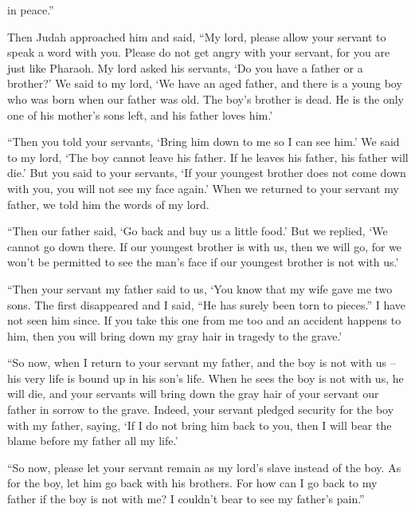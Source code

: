 {in peace.”
\par }{\PP {}Then Judah
approached
him and said,
“My lord,
please allow
your servant
to speak
a word
with you.
Please do not
get angry
with your servant,
for
you are just like
Pharaoh.
My lord
asked
his servants,
‘Do you have
a father
or
a brother?’
We said
to
my lord,
‘We have
an aged
father,
and there is a young
boy
who was born when our father was old.
The boy’s brother
is dead.
He is the only
one of his mother’s
sons left,
and his father
loves him.’
\par }{\PP {}“Then you told
your servants,
‘Bring him down
to
me so
I can
see him.’
We said
to my lord,
‘The boy
cannot
leave
his father.
If he leaves
his father, his father
will die.’
But you said
to
your servants,
‘If
your youngest
brother
does not
come down
with
you, you will not
see
my face
again.’
When
we
returned to
your servant
my father,
we told
him the words
of my lord.
\par }{\PP {}“Then our father
said,
‘Go back
and buy
us a little
food.’
But we replied,
‘We cannot
go down
there.
If
our youngest
brother
is with
us, then
we will go,
for
we won’t
be permitted
to see
the man’s
face
if
our youngest
brother
is not
with us.’
\par }{\PP {}“Then your servant
my father
said to us, ‘You
know
that
my wife
gave me two
sons.
The first
disappeared
and I said,
“He has surely
been torn
to pieces.”
I have not
seen
him since.
If you take
this
one from me too
and an accident
happens
to him, then you will bring down
my gray hair
in tragedy
to the grave.’
\par }{\PP {}“So now,
when I return
to
your servant
my father,
and the boy
is not
with us – his very life is bound up in his son’s life.
When
he sees
the boy
is not
with us, he will die,
and your servants
will bring down
the gray hair
of your servant
our father
in sorrow
to the grave.
Indeed,
your servant
pledged security
for the boy
with
my father,
saying,
‘If
I do not
bring
him back to you, then I will bear the blame
before my father
all
my life.’
\par }{\PP {}“So now,
please
let your servant
remain
as my lord’s
slave
instead
of the boy.
As for the boy,
let him go back
with
his brothers.
For
how
can I go
back to
my father
if
the boy
is not
with
me? I couldn’t
bear to see
my father’s pain.”

}
